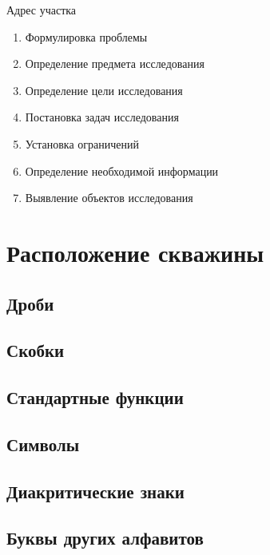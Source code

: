 \documentclass[a4paper,12pt]{article} %
\begin{document}
	Адрес участка 

	\begin{enumerate}
		\item Формулировка проблемы
		\item Определение предмета исследования
		\item Определение цели исследования
		\item Постановка задач исследования
		\item Установка ограничений
		\item Определение необходимой информации
		\item Выявление объектов исследования
	\end{enumerate}
		
	\section{Расположение скважины}
	
	\subsection{Дроби}
	
	\subsection{Скобки}
	
	\subsection{Стандартные функции}
	
	\subsection{Символы}
	
	\subsection{Диакритические знаки}
	
	\subsection{Буквы других алфавитов}
	
\end{document}
